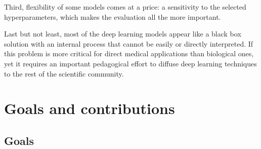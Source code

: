 Third, flexibility of some models comes at a price: a sensitivity to the selected hyperparameters, which makes the evaluation all the more important.

Last but not least, most of the deep learning models appear like a black box solution with an internal process that cannot be easily or directly interpreted.
If this problem is more critical for direct medical applications than biological ones, yet it requires an important pedagogical effort to diffuse deep learning techniques to the rest of the scientific community.

\section{Goals and contributions}
\label{sec:contributions}

\subsection{Goals}
\label{subsec:intro_goals}

